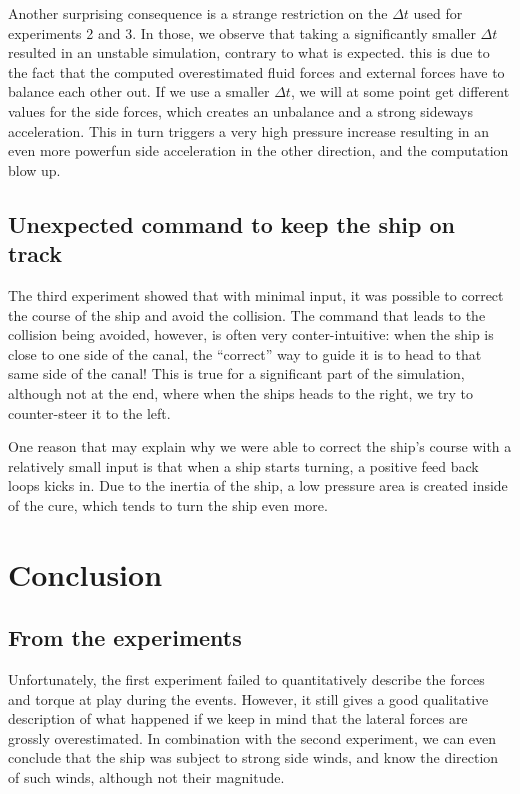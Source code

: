 \documentclass[a4paper]{article}
\begin{document}
Another surprising consequence is a strange restriction on the $\Delta t$ used for experiments 2 and 3. In those, we observe that taking a significantly smaller $\Delta t$ resulted in an unstable simulation, contrary to what is expected. this is due to the fact that the computed overestimated fluid forces and external forces have to balance each other out. If we use a smaller $\Delta t$, we will at some point get different values for the side forces, which creates an unbalance and a strong sideways acceleration. This in turn triggers a very high pressure increase resulting in an even more powerfun side acceleration in the other direction, and the computation blow up.

\subsection{Unexpected command to keep the ship on track}
The third experiment showed that with minimal input, it was possible to correct the course of the ship and avoid the collision. The command that leads to the collision being avoided, however, is often very conter-intuitive: when the ship is close to one side of the canal, the ``correct'' way to guide it is to head to that same side of the canal! This is true for a significant part of the simulation, although not at the end, where when the ships heads to the right, we try to counter-steer it to the left. 

One reason that may explain why we were able to correct the ship's course with a relatively small input is that when a ship starts turning, a positive feed back loops kicks in. Due to the inertia of the ship, a low pressure area is created inside of the cure, which tends to turn the ship even more. 

\section{Conclusion}
\subsection{From the experiments}
Unfortunately, the first experiment failed to quantitatively describe the forces and torque at play during the events. However, it still gives a good qualitative description of what happened if we keep in mind that the lateral forces are grossly overestimated. In combination with the second experiment, we can even conclude that the ship was subject to strong side winds, and know the direction of such winds, although not their magnitude.
\end{document}
